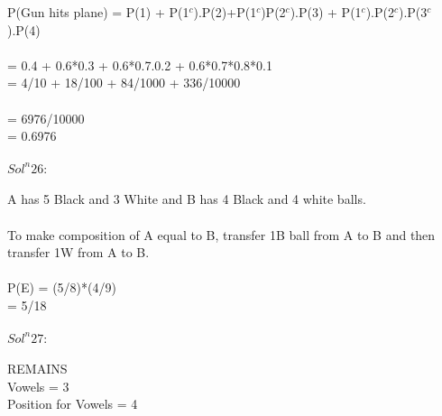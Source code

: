 \documentclass{article}
\begin{document}
P(Gun hits plane) = P(1) + P(1$^c$).P(2)+P(1$^c$)P(2$^c$).P(3) + P(1$^c$).P(2$^c$).P(3$^c$).P(4) \\\\
= 0.4 + 0.6*0.3 + 0.6*0.7.0.2 + 0.6*0.7*0.8*0.1 \\
= 4/10 + 18/100 + 84/1000 + 336/10000 \\\\
= 6976/10000 \\
= 0.6976 \\\\
\textbf{$Sol^n 26:$} \\ \\
A has 5 Black and 3 White and B has 4 Black and 4 white balls. \\\\
To make composition of A equal to B, transfer 1B ball from A to B and then transfer 1W from A to B. \\\\
P(E) = (5/8)*(4/9)\\
= 5/18 \\\\
\textbf{$Sol^n 27:$} \\ \\
REMAINS \\
Vowels = 3 \\
Position for Vowels = 4\\\\
\end{document}
